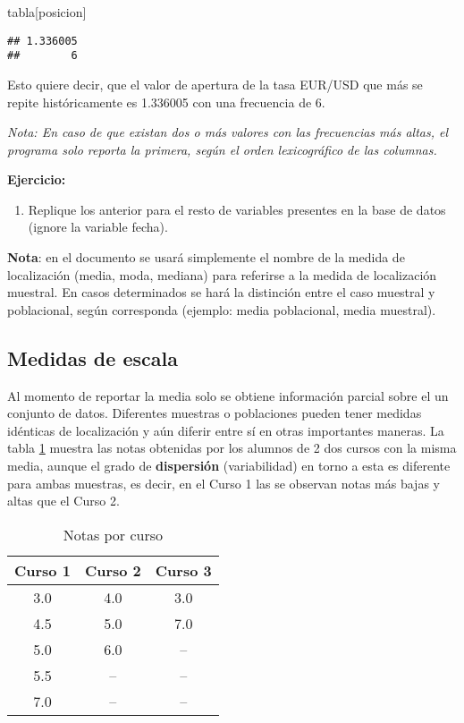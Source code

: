 \documentclass[
]{book}
\newenvironment{Shaded}{\begin{snugshade}}{\end{snugshade}}
\newcommand{\NormalTok}[1]{#1}
\providecommand{\tightlist}{%
  \setlength{\itemsep}{0pt}\setlength{\parskip}{0pt}}
\begin{document}
\begin{Shaded}
\begin{Highlighting}[]
\NormalTok{tabla[posicion]}
\end{Highlighting}
\end{Shaded}

\begin{verbatim}
## 1.336005 
##        6
\end{verbatim}

Esto quiere decir, que el valor de apertura de la tasa EUR/USD que más se repite históricamente es 1.336005 con una frecuencia de 6.

\emph{Nota: En caso de que existan dos o más valores con las frecuencias más altas, el programa solo reporta la primera, según el orden lexicográfico de las columnas.}

\textbf{Ejercicio:}

\begin{enumerate}
\def\labelenumi{\arabic{enumi}.}
\tightlist
\item
  Replique los anterior para el resto de variables presentes en la base de datos (ignore la variable fecha).
\end{enumerate}

\textbf{Nota}: en el documento se usará simplemente el nombre de la medida de localización (media, moda, mediana) para referirse a la medida de localización muestral. En casos determinados se hará la distinción entre el caso muestral y poblacional, según corresponda (ejemplo: media poblacional, media muestral).

\hypertarget{medidas-de-escala}{%
\subsection{Medidas de escala}\label{medidas-de-escala}}

Al momento de reportar la media solo se obtiene información parcial sobre el un conjunto de datos. Diferentes muestras o poblaciones pueden tener medidas idénticas de localización y aún diferir entre sí en otras importantes maneras. La tabla \ref{tab:variabilidad} muestra las notas obtenidas por los alumnos de 2 dos cursos con la misma media, aunque el grado de \textbf{dispersión} (variabilidad) en torno a esta es diferente para ambas muestras, es decir, en el Curso 1 las se observan notas más bajas y altas que el Curso 2.

\begin{table}

\caption{\label{tab:variabilidad}Notas por curso}
\centering
\begin{tabular}[t]{ccc}
\toprule
Curso 1 & Curso 2 & Curso 3\\
\midrule
3.0 & 4.0 & 3.0\\
4.5 & 5.0 & 7.0\\
5.0 & 6.0 & --\\
5.5 & -- & --\\
7.0 & -- & --\\
\bottomrule
\end{tabular}
\end{table}
\end{document}
